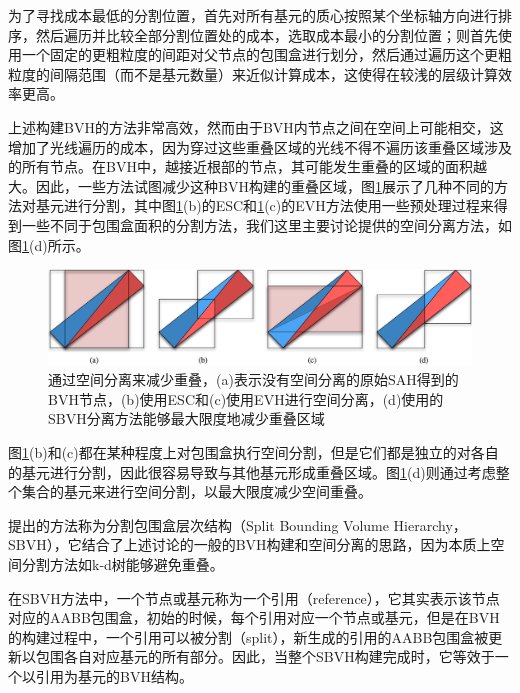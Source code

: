 为了寻找成本最低的分割位置，\cite{a:Ray-Tracing-Deterministic-3-DFractals}首先对所有基元的质心按照某个坐标轴方向进行排序，然后遍历并比较全部分割位置处的成本，选取成本最小的分割位置；\cite{b:pbrt}则首先使用一个固定的更粗粒度的间距对父节点的包围盒进行划分，然后通过遍历这个更粗粒度的间隔范围（而不是基元数量）来近似计算成本，这使得在较浅的层级计算效率更高。

上述构建BVH的方法非常高效，然而由于BVH内节点之间在空间上可能相交，这增加了光线遍历的成本，因为穿过这些重叠区域的光线不得不遍历该重叠区域涉及的所有节点。在BVH中，越接近根部的节点，其可能发生重叠的区域的面积越大。因此，一些方法试图减少这种BVH构建的重叠区域，图\ref{f:pt-sbvh}展示了几种不同的方法对基元进行分割，其中图\ref{f:pt-sbvh}(b)\cite{a:EarlySplitClippingforBoundingVolumeHierarchies}的ESC和\ref{f:pt-sbvh}(c)\cite{a:TheEdgeVolumeHeuristicRobustTriangleSubdivisionforImprovedBVHPer-formance}的EVH方法使用一些预处理过程来得到一些不同于包围盒面积的分割方法，我们这里主要讨论\cite{a:SpatialSplitsinBoundingVolumeHierarchies}提供的空间分离方法，如图\ref{f:pt-sbvh}(d)所示。

\begin{figure}
	\includegraphics[width=1.0\textwidth]{figures/pt/sbvh}
	\caption{通过空间分离来减少重叠，(a)表示没有空间分离的原始SAH得到的BVH节点，(b)使用ESC和(c)使用EVH进行空间分离，(d)使用的SBVH分离方法能够最大限度地减少重叠区域}
	\label{f:pt-sbvh}
\end{figure}

图\ref{f:pt-sbvh}(b)和(c)都在某种程度上对包围盒执行空间分割，但是它们都是独立的对各自的基元进行分割，因此很容易导致与其他基元形成重叠区域。图\ref{f:pt-sbvh}(d)则通过考虑整个集合的基元来进行空间分割，以最大限度减少空间重叠。

\cite{a:SpatialSplitsinBoundingVolumeHierarchies}提出的方法称为分割包围盒层次结构（Split Bounding Volume Hierarchy，SBVH），它结合了上述讨论的一般的BVH构建和空间分离的思路，因为本质上空间分割方法如k-d树能够避免重叠。

在SBVH方法中，一个节点或基元称为一个引用（reference），它其实表示该节点对应的AABB包围盒，初始的时候，每个引用对应一个节点或基元，但是在BVH的构建过程中，一个引用可以被分割（split），新生成的引用的AABB包围盒被更新以包围各自对应基元的所有部分。因此，当整个SBVH构建完成时，它等效于一个以引用为基元的BVH结构。

